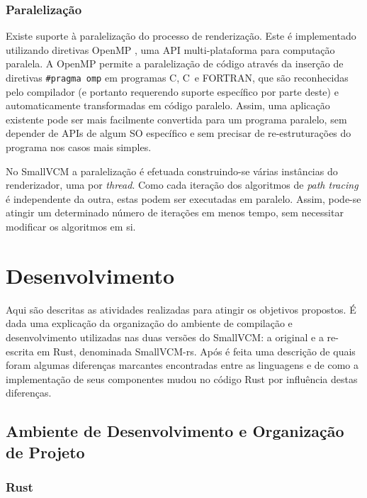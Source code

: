 \documentclass[tg]{mdtufsm}
\def\Cpp{{C\nolinebreak[4]\raisebox{.20ex}{\small\bf++}}}
\newcommand{\todo}[1]{}
\begin{document}
\todo{Diagrama das classes/módulos.}

\subsection{Paralelização}

Existe suporte à paralelização do processo de renderização. Este é implementado utilizando diretivas OpenMP \citep{openmp40}, uma API multi-plataforma para computação paralela. A OpenMP permite a paralelização de código através da inserção de diretivas \texttt{\#pragma omp} em programas C, \Cpp\ e FORTRAN, que são reconhecidas pelo compilador (e portanto requerendo suporte específico por parte deste) e automaticamente transformadas em código paralelo. Assim, uma aplicação existente pode ser mais facilmente convertida para um programa paralelo, sem depender de APIs de algum SO específico e sem precisar de re-estruturações do programa nos casos mais simples.

No SmallVCM a paralelização é efetuada construindo-se várias instâncias do renderizador, uma por \emph{thread}. Como cada iteração dos algoritmos de \emph{path tracing} é independente da outra, estas podem ser executadas em paralelo. Assim, pode-se atingir um determinado número de iterações em menos tempo, sem necessitar modificar os algoritmos em si.

\chapter{Desenvolvimento}

Aqui são descritas as atividades realizadas para atingir os objetivos propostos. É dada uma explicação da organização do ambiente de compilação e desenvolvimento utilizadas nas duas versões do SmallVCM: a original e a re-escrita em Rust, denominada SmallVCM-rs. Após é feita uma descrição de quais foram algumas diferenças marcantes encontradas entre as linguagens e de como a implementação de seus componentes mudou no código Rust por influência destas diferenças.

\section{Ambiente de Desenvolvimento e Organização de Projeto}

\subsection{Rust}
\end{document}
